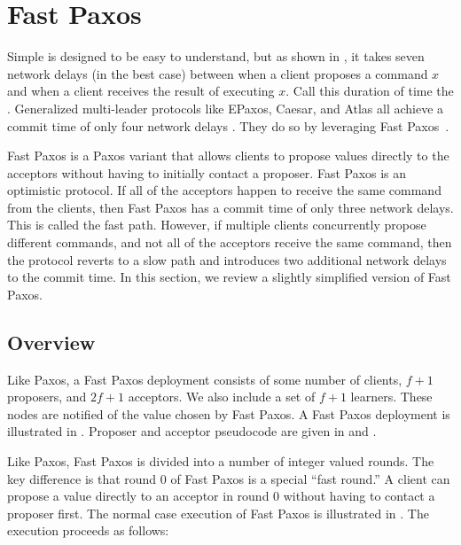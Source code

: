 \section{Fast Paxos}
{}
{}
{}

Simple \BPaxos{} is designed to be easy to understand, but as shown in
, it takes seven network delays (in the best case)
between when a client proposes a command $x$ and when a client receives the
result of executing $x$. Call this duration of time the .
Generalized multi-leader protocols like EPaxos, Caesar, and Atlas all achieve a
%
commit time of only four network delays . They
do so by leveraging Fast Paxos~\cite{lamport2006fast}.

Fast Paxos is a Paxos variant that allows clients to propose values directly to
the acceptors without having to initially contact a proposer. Fast Paxos is an
optimistic protocol. If all of the acceptors happen to receive the same command
from the clients, then Fast Paxos has a commit time of only three network
delays. This is called the fast path. However, if multiple clients concurrently
propose different commands, and not all of the acceptors receive the same
command, then the protocol reverts to a slow path and introduces two additional
network delays to the commit time.  In this section, we review a slightly
simplified version of Fast Paxos.

%
\subsection{Overview}
Like Paxos, a Fast Paxos deployment consists of some number of clients, $f+1$
proposers, and $2f+1$ acceptors. We also include a set of $f+1$ learners. These
nodes are notified of the value chosen by Fast Paxos. A Fast Paxos deployment
is illustrated in . Proposer and acceptor pseudocode
are given in  and .

Like Paxos, Fast Paxos is divided into a number of integer valued rounds.  The
key difference is that round 0 of Fast Paxos is a special ``fast round.'' A
client can propose a value directly to an acceptor in round 0 without having to
contact a proposer first. The normal case execution of Fast Paxos is
illustrated in . The execution proceeds as follows:


